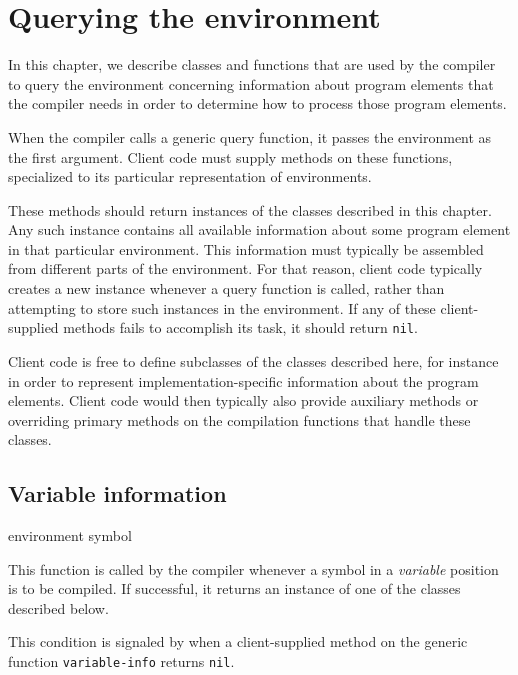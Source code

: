 \chapter{Querying the environment}

\label{chap-environment-querying}

In this chapter, we describe classes and functions that are used by
the compiler to query the environment concerning information about
program elements that the compiler needs in order to determine how to
process those program elements. 

When the compiler calls a generic query function, it passes the
environment as the first argument.  Client code must supply methods
on these functions, specialized to its particular representation of
environments. 

These methods should return instances of the classes described in this
chapter.  Any such instance contains all available information about
some program element in that particular environment.  This information
must typically be assembled from different parts of the environment.
For that reason, client code typically creates a new instance whenever
a query function is called, rather than attempting to store such
instances in the environment.  If any of these client-supplied methods
fails to accomplish its task, it should return \texttt{nil}.

Client code is free to define subclasses of the classes described
here, for instance in order to represent implementation-specific
information about the program elements.  Client code would then
typically also provide auxiliary methods or overriding primary methods
on the compilation functions that handle these classes.

\section{Variable information}

 {environment symbol}

This function is called by the compiler whenever a symbol in a
\emph{variable} position is to be compiled.  If successful, it returns an instance of
one of the classes described below.


This condition is signaled by \sysname{} when a client-supplied method
on the generic function \texttt{variable-info} returns \texttt{nil}.

